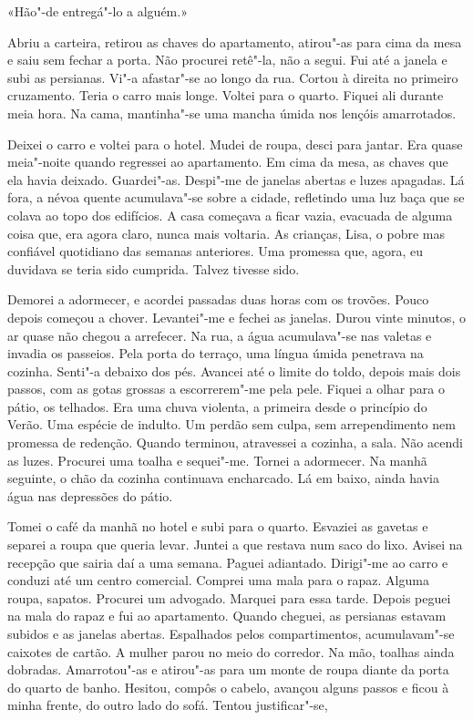 «Hão"-de entregá"-lo a alguém.»

Abriu a carteira, retirou as chaves do apartamento, atirou"-as para cima
da mesa e saiu sem fechar a porta. Não procurei retê"-la, não a segui.
Fui até a janela e subi as persianas. Vi"-a afastar"-se ao longo da rua.
Cortou à direita no primeiro cruzamento. Teria o carro mais longe.
Voltei para o quarto. Fiquei ali durante meia hora. Na cama,
mantinha"-se uma mancha úmida nos lençóis amarrotados.

Deixei o carro e voltei para o hotel. Mudei de roupa, desci para jantar.
Era quase meia"-noite quando regressei ao apartamento. Em cima da mesa,
as chaves que ela havia deixado. Guardei"-as. Despi"-me de janelas
abertas e luzes apagadas. Lá fora, a névoa quente acumulava"-se sobre a
cidade, refletindo uma luz baça que se colava ao topo dos edifícios. A
casa começava a ficar vazia, evacuada de alguma coisa que, era agora
claro, nunca mais voltaria. As crianças, Lisa, o pobre mas confiável
quotidiano das semanas anteriores. Uma promessa que, agora, eu duvidava
se teria sido cumprida. Talvez tivesse sido.

Demorei a adormecer, e acordei passadas duas horas com os trovões. Pouco
depois começou a chover. Levantei"-me e fechei as janelas. Durou vinte
minutos, o ar quase não chegou a arrefecer. Na rua, a água acumulava"-se
nas valetas e invadia os passeios. Pela porta do terraço, uma língua
úmida penetrava na cozinha. Senti"-a debaixo dos pés. Avancei até o
limite do toldo, depois mais dois passos, com as gotas grossas a
escorrerem"-me pela pele. Fiquei a olhar para o pátio, os telhados. Era
uma chuva violenta, a primeira desde o princípio do Verão. Uma espécie
de indulto. Um perdão sem culpa, sem arrependimento nem promessa de
redenção. Quando terminou, atravessei a cozinha, a sala. Não acendi as
luzes. Procurei uma toalha e sequei"-me. Tornei a adormecer. Na manhã
seguinte, o chão da cozinha continuava encharcado. Lá em baixo, ainda
havia água nas depressões do pátio.

Tomei o café da manhã no hotel e subi para o quarto. Esvaziei as
gavetas e separei a roupa que queria levar. Juntei a que restava num
saco do lixo. Avisei na recepção que sairia daí a uma semana. Paguei
adiantado. Dirigi"-me ao carro e conduzi até um centro comercial.
Comprei uma mala para o rapaz. Alguma roupa, sapatos. Procurei um
advogado. Marquei para essa tarde. Depois peguei na mala do rapaz e fui
ao apartamento. Quando cheguei, as persianas estavam subidos e as janelas
abertas. Espalhados pelos compartimentos, acumulavam"-se caixotes de
cartão. A mulher parou no meio do corredor. Na mão, toalhas ainda
dobradas. Amarrotou"-as e atirou"-as para um monte de roupa diante da
porta do quarto de banho. Hesitou, compôs o cabelo, avançou alguns
passos e ficou à minha frente, do outro lado do sofá. Tentou
justificar"-se,

